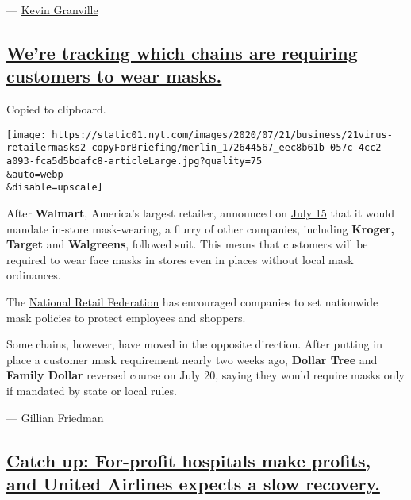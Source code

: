 --- \href{https://www.nytimes.com/by/kevin-granville}{Kevin Granville}

\hypertarget{were-tracking-which-chains-are-requiring-customers-to-wear-masks}{%
\subsection{\texorpdfstring{\protect\hyperlink{were-tracking-which-chains-are-requiring-customers-to-wear-masks}{We're
tracking which chains are requiring customers to wear
masks.}}{We're tracking which chains are requiring customers to wear masks.}}\label{were-tracking-which-chains-are-requiring-customers-to-wear-masks}}

Copied to clipboard.

\texttt{[image: https://static01.nyt.com/images/2020/07/21/business/21virus-retailermasks2-copyForBriefing/merlin\_172644567\_eec8b61b-057c-4cc2-a093-fca5d5bdafc8-articleLarge.jpg?quality=75\\\&auto=webp\\\&disable=upscale]}

After \textbf{Walmart}, America's largest retailer, announced on
\href{https://corporate.walmart.com/newsroom/2020/07/15/a-simple-step-to-help-keep-you-safe-walmart-and-sams-club-require-shoppers-to-wear-face-coverings}{July
15} that it would mandate in-store mask-wearing, a flurry of other
companies, including \textbf{Kroger, Target} and \textbf{Walgreens},
followed suit. This means that customers will be required to wear face
masks in stores even in places without local mask ordinances.

The
\href{https://nrf.com/media-center/press-releases/nrf-calls-retailers-set-nationwide-mask-policy}{National
Retail Federation} has encouraged companies to set nationwide mask
policies to protect employees and shoppers.

Some chains, however, have moved in the opposite direction. After
putting in place a customer mask requirement nearly two weeks ago,
\textbf{Dollar Tree} and \textbf{Family Dollar} reversed course on July
20, saying they would require masks only if mandated by state or local
rules.

--- Gillian Friedman

\hypertarget{catch-up-for-profit-hospitals-make-profits-and-united-airlines-expects-a-slow-recovery}{%
\subsection{\texorpdfstring{\protect\hyperlink{catch-up-for-profit-hospitals-make-profits-and-united-airlines-expects-a-slow-recovery}{Catch
up: For-profit hospitals make profits, and United Airlines expects a
slow
recovery.}}{Catch up: For-profit hospitals make profits, and United Airlines expects a slow recovery.}}\label{catch-up-for-profit-hospitals-make-profits-and-united-airlines-expects-a-slow-recovery}}

